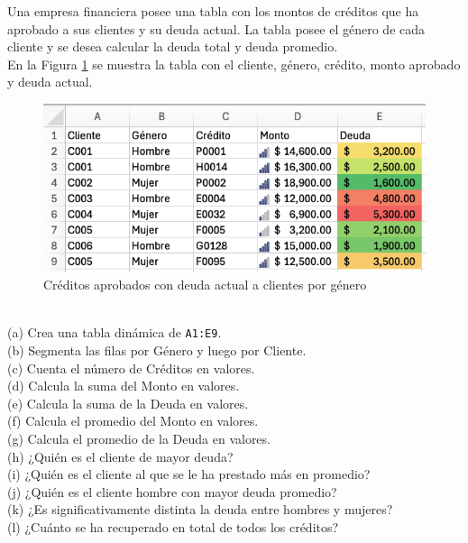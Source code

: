 \documentclass{article}
\begin{document}
Una empresa financiera posee una tabla con los montos de créditos que ha aprobado a sus clientes y su deuda actual. La tabla posee el género de cada cliente y se desea calcular la deuda total y deuda promedio.
\\[12pt]
En la Figura \ref{fig:p102} se muestra la tabla con el cliente, género, crédito, monto aprobado y deuda actual.
\begin{figure}[!ht]
    \centering
    \begin{minipage}{\textwidth}
        \centering
        \includegraphics[width=\textwidth]{figures/p102.png}
    \end{minipage}
    \captionsetup{width=0.9\textwidth}
    \caption{Créditos aprobados con deuda actual a clientes por género}
    \label{fig:p102}
\end{figure}
\\
(a) Crea una tabla dinámica de \texttt{A1:E9}.
\\[6pt]
(b) Segmenta las filas por Género y luego por Cliente.
\\[6pt]
(c) Cuenta el número de Créditos en valores.
\\[6pt]
(d) Calcula la suma del Monto en valores.
\\[6pt]
(e) Calcula la suma de la Deuda en valores.
\\[6pt]
(f) Calcula el promedio del Monto en valores.
\\[6pt]
(g) Calcula el promedio de la Deuda en valores.
\\[6pt]
(h) ¿Quién es el cliente de mayor deuda?
\\[6pt]
(i) ¿Quién es el cliente al que se le ha prestado más en promedio?
\\[6pt]
(j) ¿Quién es el cliente hombre con mayor deuda promedio?
\\[6pt]
(k) ¿Es significativamente distinta la deuda entre hombres y mujeres?
\\[6pt]
(l) ¿Cuánto se ha recuperado en total de todos los créditos?
\end{document}
